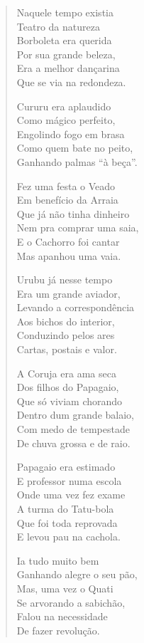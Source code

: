 \begin{verse}
Naquele tempo existia\\
Teatro da natureza\\
Borboleta era querida\\
Por sua grande beleza,\\
Era a melhor dançarina\\
Que se via na redondeza.
\pagebreak

Cururu era aplaudido\\
Como mágico perfeito,\\
Engolindo fogo em brasa\\
Como quem bate no peito,\\
Ganhando palmas “à beça”.

Fez uma festa o Veado\\
Em benefício da Arraia\\
Que já não tinha dinheiro\\
Nem pra comprar uma saia,\\
E o Cachorro foi cantar\\
Mas apanhou uma vaia.

Urubu já nesse tempo\\
Era um grande aviador,\\
Levando a correspondência\\
Aos bichos do interior,\\
Conduzindo pelos ares\\
Cartas, postais e valor.

A Coruja era ama seca\\
Dos filhos do Papagaio,\\
Que só viviam chorando\\
Dentro dum grande balaio,\\
Com medo de tempestade\\
De chuva grossa e de raio.
\pagebreak

Papagaio era estimado\\
E professor numa escola\\
Onde uma vez fez exame\\
A turma do Tatu-bola\\
Que foi toda reprovada\\
E levou pau na cachola.

Ia tudo muito bem\\
Ganhando alegre o seu pão,\\
Mas, uma vez o Quati\\
Se arvorando a sabichão,\\
Falou na necessidade\\
De fazer revolução.


\end{verse}
